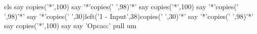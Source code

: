cls
say copies('*',100)
say '*'copies(' ',98)'*'
say copies('*',100)
say '*'copies(' ',98)'*'
say '*'copies(' ',30)left('1 - Input',38)copies(' ',30)'*'
say '*'copies(' ',98)'*'
say copies('*',100)
say
say 'Opcao:'
pull um